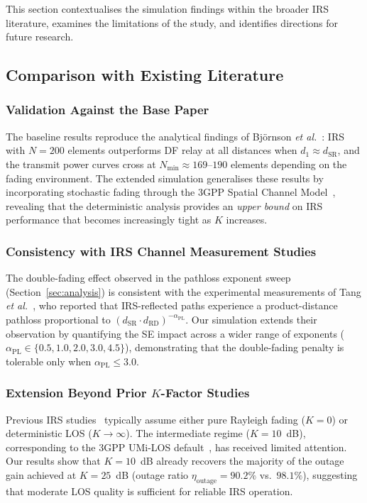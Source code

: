 \documentclass[journal]{IEEEtran} %
\begin{document}
This section contextualises the simulation findings within the broader IRS literature, examines the limitations of the study, and identifies directions for future research.

\subsection{Comparison with Existing Literature}

\subsubsection{Validation Against the Base Paper}

The baseline results reproduce the analytical findings of Bj\"{o}rnson \textit{et al.}~\cite{bjornson2020irs}: IRS with $N = 200$ elements outperforms DF relay at all distances when $d_1 \approx d_{\mathrm{SR}}$, and the transmit power curves cross at $N_{\mathrm{min}} \approx 169$--$190$ elements depending on the fading environment. The extended simulation generalises these results by incorporating stochastic fading through the 3GPP Spatial Channel Model~\cite{etsi125996}, revealing that the deterministic analysis provides an \textit{upper bound} on IRS performance that becomes increasingly tight as $K$ increases.

\subsubsection{Consistency with IRS Channel Measurement Studies}

The double-fading effect observed in the pathloss exponent sweep (Section~\ref{sec:analysis}) is consistent with the experimental measurements of Tang \textit{et al.}~\cite{tang2020irs_pathloss}, who reported that IRS-reflected paths experience a product-distance pathloss proportional to $(d_{\mathrm{SR}} \cdot d_{\mathrm{RD}})^{-\alpha_{\mathrm{PL}}}$. Our simulation extends their observation by quantifying the SE impact across a wider range of exponents ($\alpha_{\mathrm{PL}} \in \{0.5, 1.0, 2.0, 3.0, 4.5\}$), demonstrating that the double-fading penalty is tolerable only when $\alpha_{\mathrm{PL}} \leq 3.0$.

\subsubsection{Extension Beyond Prior $K$-Factor Studies}

Previous IRS studies~\cite{wu2020irs_tutorial,basar2019wireless} typically assume either pure Rayleigh fading ($K = 0$) or deterministic LOS ($K \to \infty$). The intermediate regime ($K = 10$~dB), corresponding to the 3GPP UMi-LOS default~\cite{3gpp36814}, has received limited attention. Our results show that $K = 10$~dB already recovers the majority of the outage gain achieved at $K = 25$~dB (outage ratio $\eta_{\mathrm{outage}} = 90.2\%$ vs.\ $98.1\%$), suggesting that moderate LOS quality is sufficient for reliable IRS operation.
\end{document}
